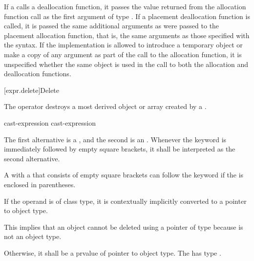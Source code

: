 \pnum
If a  calls a deallocation function, it passes
the value returned from the allocation function call as the first
argument of type . If a placement deallocation function is
called, it is passed the same additional arguments as were passed to the
placement allocation function, that is, the same arguments as those
specified with the  syntax.
If the implementation is allowed
to introduce a temporary object or make a copy of any argument
as part of the call to the allocation function,
it is unspecified whether the same object is used in the call
to both the allocation and deallocation functions.

[expr.delete]{Delete}

\pnum
{}%
%
The  operator destroys a most derived
object or array created by a
.

\begin{bnf}
\br
    \opt{\terminal{::}}  cast-expression\br
    \opt{\terminal{::}}  \terminal{[} \terminal{]} cast-expression
\end{bnf}

The first alternative is a
, and the
second is an .
Whenever the  keyword is immediately followed by empty square
brackets, it shall be interpreted as the second alternative.
\begin{footnote}
A
 with a 
that consists of empty square brackets can follow the  keyword
if the  is enclosed in parentheses.
\end{footnote}
If the operand is of
class type, it is contextually implicitly converted
to a pointer to object
type.
\begin{footnote}
This implies that an object
cannot be deleted using a pointer of type
 because  is not an object type.
\end{footnote}
Otherwise, it shall be a prvalue of pointer to object type.
The  has type
.

